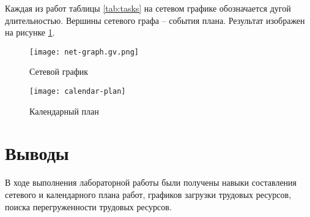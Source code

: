 \documentclass[a4paper,14pt]{extarticle}
\begin{document}
Каждая из работ таблицы \ref{tab:tasks} на сетевом графике обозначается дугой
длительностью. Вершины сетевого графа -- события плана. Результат изображен на
рисунке \ref{fig:net-graph}.
\begin{figure}[H]
    \centering
    \texttt{[image: net-graph.gv.png]}
    \caption{Сетевой график}
    \label{fig:net-graph}
\end{figure}

\begin{landscape}
\begin{figure}[H]
    \centering
    \texttt{[image: calendar-plan]}
    \caption{Календарный план}
    \label{fig:calendar-plan}
\end{figure}
\end{landscape}

\section*{Выводы}
В ходе выполнения лабораторной работы были получены навыки составления сетевого
и календарного плана работ, графиков загрузки трудовых ресурсов, поиска
перегруженности трудовых ресурсов.
\end{document}
